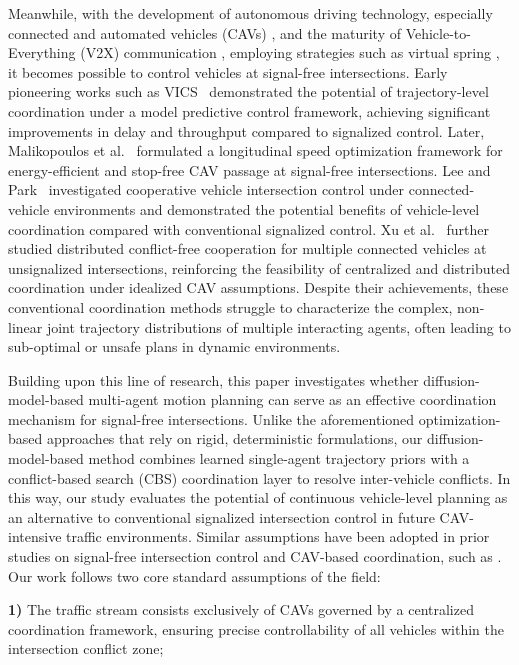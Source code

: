 \documentclass[journal]{IEEEtran}
\begin{document}
Meanwhile, with the development of autonomous driving technology, especially connected and automated vehicles (CAVs) \cite{guanetti2018}, and the maturity of Vehicle-to-Everything (V2X) communication \cite{yoshizawa2023}, employing strategies such as virtual spring \cite{gong2024}, it becomes possible to control vehicles at signal-free intersections. Early pioneering works such as VICS~\cite{kamal2015} demonstrated the potential of trajectory-level coordination under a model predictive control framework, achieving significant improvements in delay and throughput compared to signalized control. Later, Malikopoulos et al.~\cite{malikopoulos2018} formulated a longitudinal speed optimization framework for energy-efficient and stop-free CAV passage at signal-free intersections. Lee and Park~\cite{lee2012} investigated cooperative vehicle intersection control under connected-vehicle environments and demonstrated the potential benefits of vehicle-level coordination compared with conventional signalized control. Xu et al.~\cite{xu2018} further studied distributed conflict-free cooperation for multiple connected vehicles at unsignalized intersections, reinforcing the feasibility of centralized and distributed coordination under idealized CAV assumptions. Despite their achievements, these conventional coordination methods struggle to characterize the complex, non-linear joint trajectory distributions of multiple interacting agents, often leading to sub-optimal or unsafe plans in dynamic environments.

Building upon this line of research, this paper investigates whether diffusion-model-based multi-agent motion planning can serve as an effective coordination mechanism for signal-free intersections. Unlike the aforementioned optimization-based approaches that rely on rigid, deterministic formulations, our diffusion-model-based method combines learned single-agent trajectory priors with a conflict-based search (CBS) coordination layer to resolve inter-vehicle conflicts. In this way, our study evaluates the potential of continuous vehicle-level planning as an alternative to conventional signalized intersection control in future CAV-intensive traffic environments. Similar assumptions have been adopted in prior studies on signal-free intersection control and CAV-based coordination, such as \cite{xu2018}. Our work follows two core standard assumptions of the field:


\textbf{1)} The traffic stream consists exclusively of CAVs governed by a centralized coordination framework, ensuring precise controllability of all vehicles within the intersection conflict zone;
\end{document}
